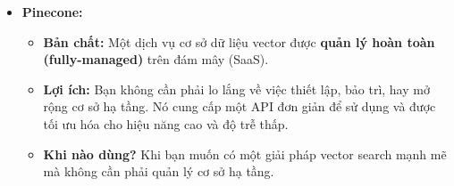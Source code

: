 \begin{itemize}
\begin{itemize}
        \end{itemize}
    \item \textbf{Pinecone:}
        \begin{itemize}
            \item \textbf{Bản chất:} Một dịch vụ cơ sở dữ liệu vector được \textbf{quản lý hoàn toàn (fully-managed)} trên đám mây (SaaS).
            \item \textbf{Lợi ích:} Bạn không cần phải lo lắng về việc thiết lập, bảo trì, hay mở rộng cơ sở hạ tầng. Nó cung cấp một API đơn giản để sử dụng và được tối ưu hóa cho hiệu năng cao và độ trễ thấp.
            \item \textbf{Khi nào dùng?} Khi bạn muốn có một giải pháp vector search mạnh mẽ mà không cần phải quản lý cơ sở hạ tầng.
        \end{itemize}
\end{itemize}